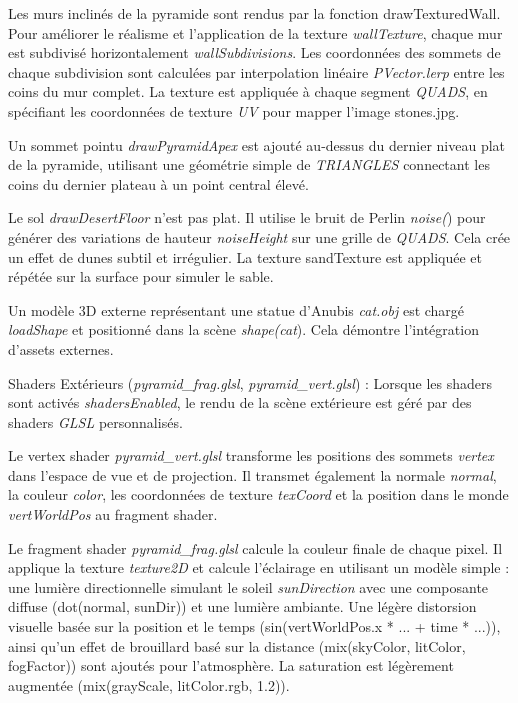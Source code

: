 \documentclass[12pt,oneside,letterpaper]{article}
\begin{document}
Les murs inclinés de la pyramide sont rendus par la fonction drawTexturedWall. Pour améliorer le réalisme et l'application de la texture \textit{wallTexture}, chaque mur est subdivisé horizontalement \textit{wallSubdivisions}. Les coordonnées des sommets de chaque subdivision sont calculées par interpolation linéaire \textit{PVector.lerp} entre les coins du mur complet. La texture est appliquée à chaque segment \textit{QUADS}, en spécifiant les coordonnées de texture \textit{UV} pour mapper l'image stones.jpg.

Un sommet pointu \textit{drawPyramidApex} est ajouté au-dessus du dernier niveau plat de la pyramide, utilisant une géométrie simple de \textit{TRIANGLES} connectant les coins du dernier plateau à un point central élevé.

Le sol \textit{drawDesertFloor} n'est pas plat. Il utilise le bruit de Perlin \textit{noise(}) pour générer des variations de hauteur \textit{noiseHeight} sur une grille de \textit{QUADS}. Cela crée un effet de dunes subtil et irrégulier. La texture sandTexture est appliquée et répétée sur la surface pour simuler le sable.

Un modèle 3D externe représentant une statue d'Anubis \textit{cat.obj} est chargé \textit{loadShape} et positionné dans la scène \textit{shape(cat}). Cela démontre l'intégration d'assets externes.

Shaders Extérieurs (\textit{pyramid\_frag.glsl}, \textit{pyramid\_vert.glsl}) : Lorsque les shaders sont activés \textit{shadersEnabled}, le rendu de la scène extérieure est géré par des shaders \textit{GLSL} personnalisés.

Le vertex shader \textit{\textit{pyramid\_vert.glsl}} transforme les positions des sommets \textit{vertex} dans l'espace de vue et de projection. Il transmet également la normale \textit{normal}, la couleur \textit{color}, les coordonnées de texture \textit{texCoord} et la position dans le monde \textit{vertWorldPos} au fragment shader.

Le fragment shader \textit{\textit{pyramid\_frag.glsl}} calcule la couleur finale de chaque pixel. Il applique la texture \textit{texture2D} et calcule l'éclairage en utilisant un modèle simple : une lumière directionnelle simulant le soleil \textit{sunDirection} avec une composante diffuse (dot(normal, sunDir)) et une lumière ambiante. Une légère distorsion visuelle basée sur la position et le temps (sin(vertWorldPos.x * ... + time * ...)), ainsi qu'un effet de brouillard basé sur la distance (mix(skyColor, litColor, fogFactor)) sont ajoutés pour l'atmosphère. La saturation est légèrement augmentée (mix(grayScale, litColor.rgb, 1.2)).
\end{document}
